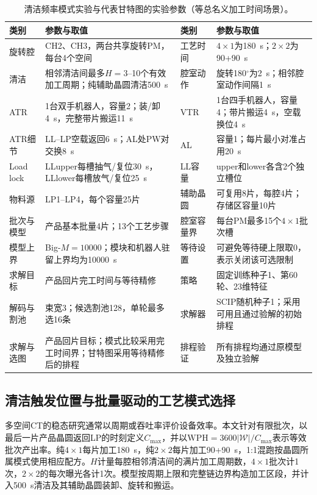 \documentclass[journal]{IEEEtran}
\begin{document}
\begin{table}[!htbp]
\centering
\footnotesize
\setlength{\tabcolsep}{2pt}
\caption{清洁频率模式实验与代表甘特图的实验参数（等总名义加工时间场景）。}
\label{tab:gantt-config-zh}
\begin{tabular}{C{0.10\textwidth} C{0.29\textwidth} C{0.10\textwidth} C{0.29\textwidth}}
\toprule
类别 & 参数与取值 & 类别 & 参数与取值\\
\midrule
旋转腔 & CH2、CH3，两台共享旋转PM，每台4个空间 & 工艺时间 & $4\times1$为180~s；$2\times2$为90+90~s\\
清洁 & 相邻清洁间最多$H=3$--10个有效加工周期；纯辅助晶圆清洁500~s & 腔室动作 & 旋转180$^\circ$为2~s；相邻腔室动作间隔1~s\\
ATR & 1台双手机器人，容量2；装/卸4~s，完整带片搬运11~s & VTR & 1台四手机器人，容量4；带片搬运4~s，空载换位4~s\\
ATR细节 & LL--LP空载返回6~s；AL处PW对交换8~s & AL & 容量1；每片最小对准占用20~s\\
Load lock & LLupper每槽抽气/复位30~s，LLlower每槽放气/复位25~s & LL容量 & upper和lower各含2个独立槽位\\
物料源 & LP1--LP4，每个容量25片 & 辅助晶圆 & 可复用8片，每腔4片；存储区容量10片\\
批次与模型 & 产品基本批量4片；13个工艺步骤 & 腔室容量界 & 每台PM最多15个$4\times1$批次槽\\
模型上界 & Big-$M=10000$；模块和机器人驻留上界均为10000~s & 等待设置 & 可避免等待硬上限取0，表示关闭该可选限制\\
求解目标 & 产品回片完工时间与等待精修 & 策略 & 固定训练种子1、第60轮、23维特征\\
解码与割池 & 束宽3；候选割池128，单轮最多选16条 & 求解器 & SCIP随机种子1；采用可用且通过验解的初始排程\\
求解与选图 & 产品回片目标；模式比较采用完工时间界；甘特图采用等待精修后的排程 & 排程验证 & 所有排程均通过原模型及独立验解\\
\bottomrule
\end{tabular}
\end{table}

\subsection{清洁触发位置与批量驱动的工艺模式选择}

多空间CT的稳态研究通常以周期或吞吐率评价设备效率\cite{gu2024multifinger}。本文针对有限批次，以最后一片产品晶圆返回LP的时刻定义$C_{\max}$，并以$\mathrm{WPH}=3600|\mathcal W|/C_{\max}$表示等效批次产出率。纯$4\times1$每片加工180~s，纯$2\times2$每片加工90+90~s，1:1混跑按晶圆所属模式使用相应配方。$H$计量每腔相邻清洁间的满片加工周期数，$4\times1$批次计1次，$2\times2$的每次曝光各计1次。模型按周期上限和完整链边界构造加工区段，并计入500~s清洁及其辅助晶圆装卸、旋转和搬运。
\end{document}
